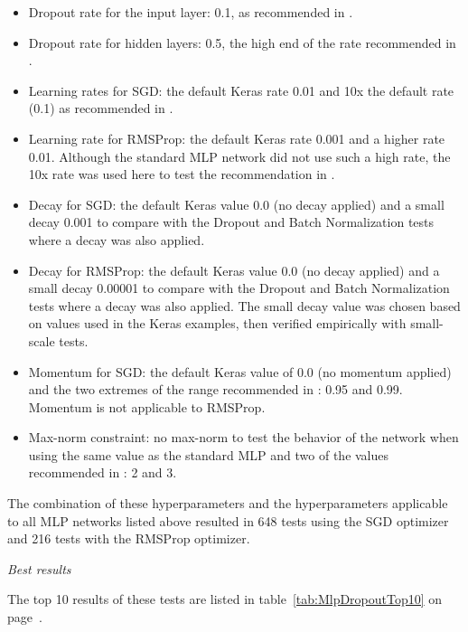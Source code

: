 \documentclass[../CAP6619_term_project_cgarbin.tex]{subfiles}
\begin{document}
\begin{itemize}
\item Dropout rate for the input layer: 0.1, as recommended in \cite{Srivastava2014}.
\item Dropout rate for hidden layers: 0.5, the high end of the rate recommended in \cite{Srivastava2014}.
\item Learning rates for SGD: the default Keras rate 0.01 and 10x the default rate (0.1) as recommended in \cite{Srivastava2014}.
\item Learning rate for RMSProp: the default Keras rate 0.001 and a higher rate 0.01. Although the standard MLP network did not use such a high rate, the 10x rate was used here to test the recommendation in \cite{Srivastava2014}.
\item Decay for SGD: the default Keras value 0.0 (no decay applied) and a small decay 0.001 to compare with the Dropout and Batch Normalization tests where a decay was also applied.
\item Decay for RMSProp: the default Keras value 0.0 (no decay applied) and a small decay 0.00001 to compare with the Dropout and Batch Normalization tests where a decay was also applied. The small decay value was chosen based on values used in the Keras examples, then verified empirically with small-scale tests.
\item Momentum for SGD: the default Keras value of 0.0 (no momentum applied) and the two extremes of the range recommended in \cite{Srivastava2014}: 0.95 and 0.99. Momentum is not applicable to RMSProp.
\item Max-norm constraint: no max-norm to test the behavior of the network when using the same value as the standard MLP and two of the values recommended in \cite{Srivastava2014}: 2 and 3.
\end{itemize}

The combination of these hyperparameters and the hyperparameters applicable to all MLP networks listed above resulted in 648 tests using the SGD optimizer and 216 tests with the RMSProp optimizer.

\medskip
\textit{Best results}

The top 10 results of these tests are listed in table~\ref{tab:MlpDropoutTop10} on page~\pageref{tab:MlpDropoutTop10}.
\end{document}
